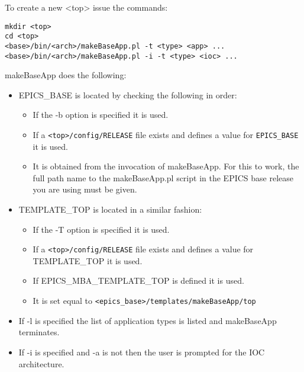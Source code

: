 To create a new \textless{}top\textgreater{} issue the commands:

\begin{verbatim}mkdir <top>
cd <top>
<base>/bin/<arch>/makeBaseApp.pl -t <type> <app> ... 
<base>/bin/<arch>/makeBaseApp.pl -i -t <type> <ioc> ...
\end{verbatim}makeBaseApp does the following:

\begin{itemize}

\item EPICS\_BASE is located by checking the following in order:

\begin{itemize}

\item If the -b option is specified it is used.

\item If a \verb|<top>/config/RELEASE| file exists and defines a value for \verb|EPICS_BASE| it is used.

\item It is obtained from the invocation of makeBaseApp. For this to work, the full path name to the 
makeBaseApp.pl script in the EPICS base release you are using must be given.

\end{itemize}\item TEMPLATE\_TOP is located in a similar fashion:

\begin{itemize}

\item If the -T option is specified it is used.

\item If a \verb|<top>/config/RELEASE| file exists and defines a value for TEMPLATE\_TOP it is used.

\item If EPICS\_MBA\_TEMPLATE\_TOP is defined it is used.

\item It is set equal to \verb|<epics_base>/templates/makeBaseApp/top|

\end{itemize}

\item If -l is specified the list of application types is listed and makeBaseApp terminates.

\item If -i is specified and -a is not then the user is prompted for the IOC architecture.


\end{itemize}
